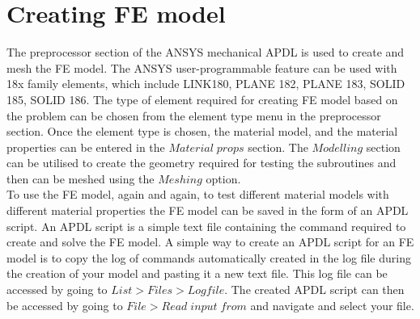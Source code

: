 \documentclass[a4paper,12pt,twoside]{report}
\begin{document}
\section{Creating FE model}
\indent\indent\indent  The preprocessor section of the ANSYS mechanical APDL is used to create and mesh the FE model. The ANSYS user-programmable feature can be used with 18x family elements, which include LINK180, PLANE 182, PLANE 183, SOLID 185, SOLID 186. The type of element required for creating FE model based on the problem can be chosen from the element type menu in the preprocessor section. Once the element type is chosen, the material model, and the material properties can be entered in the $Material\; props$ section.  The $Modelling$ section can be utilised to create the geometry required for testing the subroutines and then can be meshed using the $Meshing$ option.\\ \indent\indent\indent To use the FE model, again and again, to test different material models with different material properties the FE model can be saved in the form of an APDL script.  An APDL script is a simple text file containing the command required to create and solve the FE model. A simple way to create an APDL script for an FE model is to copy the log of commands automatically created in the log file during the creation of your model and pasting it a new text file. This log file can be accessed by going to $List>Files>Logfile$. The created APDL script can then be accessed by going to $File>Read \;input\; from$ and navigate and select your file.
\end{document}
